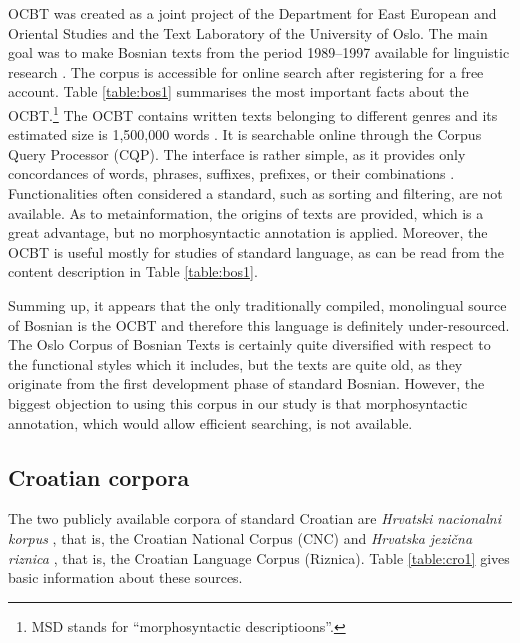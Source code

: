 OCBT was created as a joint project of the Department for East European and Oriental Studies and the Text Laboratory of the University of Oslo. The main goal was to make Bosnian texts from the period 1989--1997 available for linguistic research \citep{Santos98}. The corpus is accessible for online search after registering for a free account. Table \ref{table:bos1} summarises the most important facts about the OCBT.\footnote{MSD stands for ``morphosyntactic descriptioons''.} The OCBT contains written texts belonging to different genres and its estimated size is 1,500,000 words \citep{Santos98}. It is searchable online through the Corpus Query Processor (CQP). The interface is rather simple, as it provides only concordances of words, phrases, suffixes, prefixes, or their combinations \citep{Santos98}. Functionalities often considered a standard, such as sorting and filtering, are not available. As to metainformation, the origins of texts are provided, which is a great advantage, but no morphosyntactic annotation is applied. Moreover, the OCBT is useful mostly for studies of standard language, as can be read from the content description in Table \ref{table:bos1}.

Summing up, it appears that the only traditionally compiled, monolingual source of Bosnian is the OCBT and therefore this language is definitely under-resourced. The Oslo Corpus of Bosnian Texts is certainly quite diversified with respect to the functional styles which it includes, but the texts are quite old, as they originate from the first development phase of standard Bosnian. However, the biggest objection to using this corpus in our study is that morphosyntactic annotation, which would allow efficient searching, is not available.

\subsection{Croatian corpora}

The two publicly available corpora of standard Croatian are \textit{Hrvatski nacionalni korpus} \citep{Tadic02, Tadic20}, that is, the Croatian National Corpus (CNC) and \textit{Hrvatska jezična riznica} \citep{CavarRoncevic11, CavarBrozovic12}, that is, the  Croatian Language Corpus (Riznica). Table \ref{table:cro1} gives basic information about these sources.

